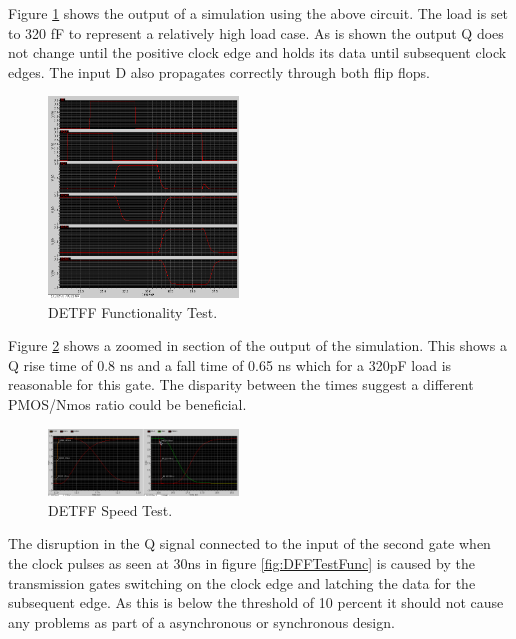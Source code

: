 Figure \ref{fig:DETFFTestFunc} shows the output of a simulation using the above circuit. The load is set to 320 fF to represent a relatively high load case. As is shown the output Q does not change until the positive clock edge and holds its data until subsequent clock edges. The input D also propagates correctly through both flip flops.

\begin{figure}[h]  
\centering
   \includegraphics[width=0.45\textwidth]{Figures/DETFFTestFunc.png}
\caption{DETFF Functionality Test.}
\label {fig:DETFFTestFunc}
\end{figure}

Figure \ref{fig:DETFFTestSpeed} shows a zoomed in section of the output of the simulation. This shows a Q rise time of 0.8 ns and a fall time of 0.65 ns which for a 320pF load is reasonable for this gate. The disparity between the times suggest a different PMOS/Nmos ratio could be beneficial.

\begin{figure}[h]  
\centering
   \includegraphics[width=0.45\textwidth]{Figures/DETFFTestSpeed.png}
\caption{DETFF Speed Test.}
\label {fig:DETFFTestSpeed}
\end{figure}

The disruption in the Q signal connected to the input of the second gate when the clock pulses as seen at 30ns in figure \ref{fig:DFFTestFunc} is caused by the transmission gates switching on the clock edge and latching the data for the subsequent edge. As this is below the threshold of 10 percent it should not cause any problems as part of a asynchronous or synchronous design.


